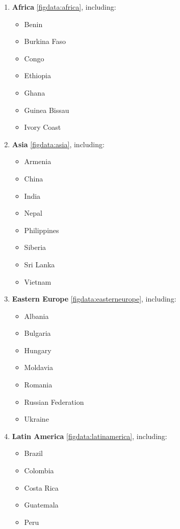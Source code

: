 \begin{enumerate}
    \item \textbf{Africa} \ref{figdata:africa}, including:
    		\begin{itemize}
    			\item Benin
    			\item Burkina Faso
    			\item Congo
    			\item Ethiopia
    			\item Ghana
    			\item Guinea Bissau
    			\item Ivory Coast
    		\end{itemize}
    \item \textbf{Asia} \ref{figdata:asia}, including:
    		\begin{itemize}
    			\item Armenia
    			\item China
    			\item India
    			\item Nepal
    			\item Philippines
    			\item Siberia
    			\item Sri Lanka
    			\item Vietnam
    		\end{itemize}
    \item \textbf{Eastern Europe} \ref{figdata:easterneurope}, including:
    		\begin{itemize}
    			\item Albania
    			\item Bulgaria
    			\item Hungary
    			\item Moldavia
    			\item Romania
    			\item Russian Federation
    			\item Ukraine
    		\end{itemize}
    \item \textbf{Latin America} \ref{figdata:latinamerica}, including:
    		\begin{itemize}
    			\item Brazil
    			\item Colombia
    			\item Costa Rica
    			\item Guatemala
    			\item Peru
    		\end{itemize}
\end{enumerate}

